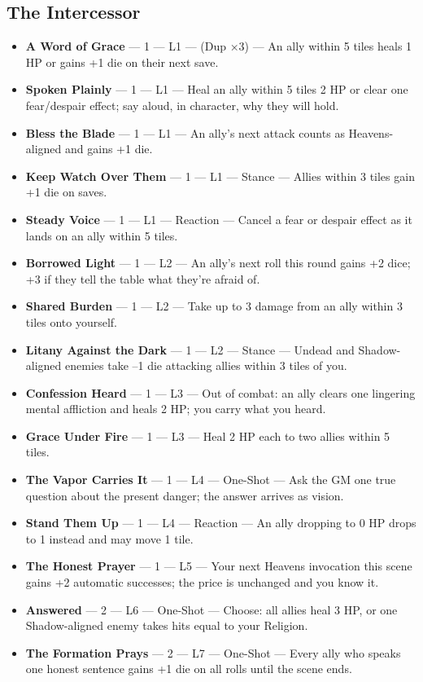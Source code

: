 \subsection{The Intercessor}
\begin{itemize}
    \item \textbf{A Word of Grace} --- 1 --- L1 --- (Dup ×3) --- An ally within 5 tiles heals 1 HP or gains +1 die on their next save.
    \item \textbf{Spoken Plainly} --- 1 --- L1 --- Heal an ally within 5 tiles 2 HP or clear one fear/despair effect; say aloud, in character, why they will hold.
    \item \textbf{Bless the Blade} --- 1 --- L1 --- An ally's next attack counts as Heavens-aligned and gains +1 die.
    \item \textbf{Keep Watch Over Them} --- 1 --- L1 --- Stance --- Allies within 3 tiles gain +1 die on saves.
    \item \textbf{Steady Voice} --- 1 --- L1 --- Reaction --- Cancel a fear or despair effect as it lands on an ally within 5 tiles.
    \item \textbf{Borrowed Light} --- 1 --- L2 --- An ally's next roll this round gains +2 dice; +3 if they tell the table what they're afraid of.
    \item \textbf{Shared Burden} --- 1 --- L2 --- Take up to 3 damage from an ally within 3 tiles onto yourself.
    \item \textbf{Litany Against the Dark} --- 1 --- L2 --- Stance --- Undead and Shadow-aligned enemies take --1 die attacking allies within 3 tiles of you.
    \item \textbf{Confession Heard} --- 1 --- L3 --- Out of combat: an ally clears one lingering mental affliction and heals 2 HP; you carry what you heard.
    \item \textbf{Grace Under Fire} --- 1 --- L3 --- Heal 2 HP each to two allies within 5 tiles.
    \item \textbf{The Vapor Carries It} --- 1 --- L4 --- One-Shot --- Ask the GM one true question about the present danger; the answer arrives as vision.
    \item \textbf{Stand Them Up} --- 1 --- L4 --- Reaction --- An ally dropping to 0 HP drops to 1 instead and may move 1 tile.
    \item \textbf{The Honest Prayer} --- 1 --- L5 --- Your next Heavens invocation this scene gains +2 automatic successes; the price is unchanged and you know it.
    \item \textbf{Answered} --- 2 --- L6 --- One-Shot --- Choose: all allies heal 3 HP, or one Shadow-aligned enemy takes hits equal to your Religion.
    \item \textbf{The Formation Prays} --- 2 --- L7 --- One-Shot --- Every ally who speaks one honest sentence gains +1 die on all rolls until the scene ends.
\end{itemize}

